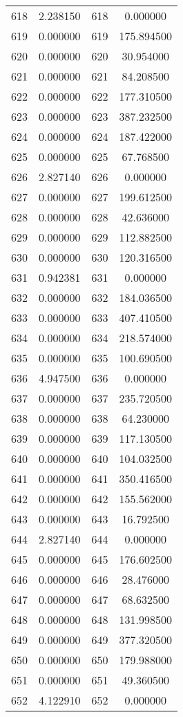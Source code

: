 \documentclass[12pt]{article}
\begin{document}
\begin{longtable}{@{}cccc@{}}
618 & 2.238150 & 618 & 0.000000 \\
619 & 0.000000 & 619 & 175.894500 \\
620 & 0.000000 & 620 & 30.954000 \\
621 & 0.000000 & 621 & 84.208500 \\
622 & 0.000000 & 622 & 177.310500 \\
623 & 0.000000 & 623 & 387.232500 \\
624 & 0.000000 & 624 & 187.422000 \\
625 & 0.000000 & 625 & 67.768500 \\
626 & 2.827140 & 626 & 0.000000 \\
627 & 0.000000 & 627 & 199.612500 \\
628 & 0.000000 & 628 & 42.636000 \\
629 & 0.000000 & 629 & 112.882500 \\
630 & 0.000000 & 630 & 120.316500 \\
631 & 0.942381 & 631 & 0.000000 \\
632 & 0.000000 & 632 & 184.036500 \\
633 & 0.000000 & 633 & 407.410500 \\
634 & 0.000000 & 634 & 218.574000 \\
635 & 0.000000 & 635 & 100.690500 \\
636 & 4.947500 & 636 & 0.000000 \\
637 & 0.000000 & 637 & 235.720500 \\
638 & 0.000000 & 638 & 64.230000 \\
639 & 0.000000 & 639 & 117.130500 \\
640 & 0.000000 & 640 & 104.032500 \\
641 & 0.000000 & 641 & 350.416500 \\
642 & 0.000000 & 642 & 155.562000 \\
643 & 0.000000 & 643 & 16.792500 \\
644 & 2.827140 & 644 & 0.000000 \\
645 & 0.000000 & 645 & 176.602500 \\
646 & 0.000000 & 646 & 28.476000 \\
647 & 0.000000 & 647 & 68.632500 \\
648 & 0.000000 & 648 & 131.998500 \\
649 & 0.000000 & 649 & 377.320500 \\
650 & 0.000000 & 650 & 179.988000 \\
651 & 0.000000 & 651 & 49.360500 \\
652 & 4.122910 & 652 & 0.000000 \\

\end{longtable}
\end{document}
